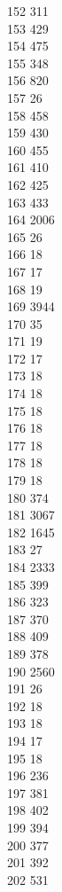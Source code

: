 { 152	311 \\
 153	429 \\
 154	475 \\
 155	348 \\
 156	820 \\
 157	26 \\
 158	458 \\
 159	430 \\
 160	455 \\
 161	410 \\
 162	425 \\
 163	433 \\
 164	2006 \\
 165	26 \\
 166	18 \\
 167	17 \\
 168	19 \\
 169	3944 \\
 170	35 \\
 171	19 \\
 172	17 \\
 173	18 \\
 174	18 \\
 175	18 \\
 176	18 \\
 177	18 \\
 178	18 \\
 179	18 \\
 180	374 \\
 181	3067 \\
 182	1645 \\
 183	27 \\
 184	2333 \\
 185	399 \\
 186	323 \\
 187	370 \\
 188	409 \\
 189	378 \\
 190	2560 \\
 191	26 \\
 192	18 \\
 193	18 \\
 194	17 \\
 195	18 \\
 196	236 \\
 197	381 \\
 198	402 \\
 199	394 \\
 200	377 \\
 201	392 \\
 202	531 \\
}
